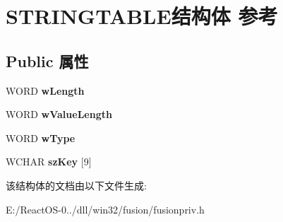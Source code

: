 \hypertarget{struct_s_t_r_i_n_g_t_a_b_l_e}{}\section{S\+T\+R\+I\+N\+G\+T\+A\+B\+L\+E结构体 参考}
\label{struct_s_t_r_i_n_g_t_a_b_l_e}
\subsection*{Public 属性}
\begin{DoxyCompactItemize}
\item 
\mbox{\label{struct_s_t_r_i_n_g_t_a_b_l_e_aca221c2ad4e061f22d68e2fbe80abd41}} 
W\+O\+RD {\bfseries w\+Length}
\item 
\mbox{\label{struct_s_t_r_i_n_g_t_a_b_l_e_a046710b724af26cb82dc3cfb438c4ecf}} 
W\+O\+RD {\bfseries w\+Value\+Length}
\item 
\mbox{\label{struct_s_t_r_i_n_g_t_a_b_l_e_acac3a050708c70277b03fb7fa93e9b05}} 
W\+O\+RD {\bfseries w\+Type}
\item 
\mbox{\label{struct_s_t_r_i_n_g_t_a_b_l_e_ab5e736d595ae25afd8c754d1f627731d}} 
W\+C\+H\+AR {\bfseries sz\+Key} \mbox{[}9\mbox{]}
\end{DoxyCompactItemize}


该结构体的文档由以下文件生成\+:\begin{DoxyCompactItemize}
\item 
E\+:/\+React\+O\+S-\/0../dll/win32/fusion/fusionpriv.\+h\end{DoxyCompactItemize}
